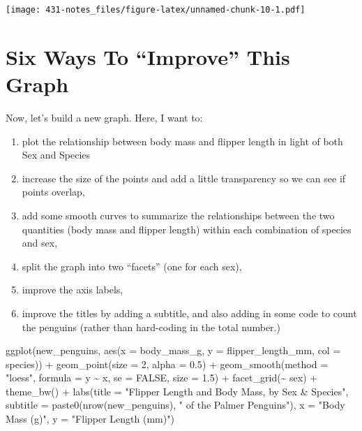 \documentclass[
]{book}
\newenvironment{Shaded}{\begin{snugshade}}{\end{snugshade}}
\newcommand{\AttributeTok}[1]{\textcolor[rgb]{0.77,0.63,0.00}{#1}}
\newcommand{\ConstantTok}[1]{\textcolor[rgb]{0.00,0.00,0.00}{#1}}
\newcommand{\DecValTok}[1]{\textcolor[rgb]{0.00,0.00,0.81}{#1}}
\newcommand{\FloatTok}[1]{\textcolor[rgb]{0.00,0.00,0.81}{#1}}
\newcommand{\FunctionTok}[1]{\textcolor[rgb]{0.00,0.00,0.00}{#1}}
\newcommand{\NormalTok}[1]{#1}
\newcommand{\SpecialCharTok}[1]{\textcolor[rgb]{0.00,0.00,0.00}{#1}}
\newcommand{\StringTok}[1]{\textcolor[rgb]{0.31,0.60,0.02}{#1}}
\providecommand{\tightlist}{%
  \setlength{\itemsep}{0pt}\setlength{\parskip}{0pt}}
\begin{document}
\texttt{[image: 431-notes\_files/figure-latex/unnamed-chunk-10-1.pdf]}

\hypertarget{six-ways-to-improve-this-graph}{%
\section{Six Ways To ``Improve'' This Graph}\label{six-ways-to-improve-this-graph}}

Now, let's build a new graph. Here, I want to:

\begin{enumerate}
\def\labelenumi{\arabic{enumi}.}
\tightlist
\item
  plot the relationship between body mass and flipper length in light of both Sex and Species
\item
  increase the size of the points and add a little transparency so we can see if points overlap,
\item
  add some smooth curves to summarize the relationships between the two quantities (body mass and flipper length) within each combination of species and sex,
\item
  split the graph into two ``facets'' (one for each sex),
\item
  improve the axis labels,
\item
  improve the titles by adding a subtitle, and also adding in some code to count the penguins (rather than hard-coding in the total number.)
\end{enumerate}

\begin{Shaded}
\begin{Highlighting}[]
\FunctionTok{ggplot}\NormalTok{(new\_penguins, }\FunctionTok{aes}\NormalTok{(}\AttributeTok{x =}\NormalTok{ body\_mass\_g, }\AttributeTok{y =}\NormalTok{ flipper\_length\_mm, }
                         \AttributeTok{col =}\NormalTok{ species)) }\SpecialCharTok{+}
    \FunctionTok{geom\_point}\NormalTok{(}\AttributeTok{size =} \DecValTok{2}\NormalTok{, }\AttributeTok{alpha =} \FloatTok{0.5}\NormalTok{) }\SpecialCharTok{+} 
    \FunctionTok{geom\_smooth}\NormalTok{(}\AttributeTok{method =} \StringTok{"loess"}\NormalTok{, }\AttributeTok{formula =}\NormalTok{ y }\SpecialCharTok{\textasciitilde{}}\NormalTok{ x, }
                \AttributeTok{se =} \ConstantTok{FALSE}\NormalTok{, }\AttributeTok{size =} \FloatTok{1.5}\NormalTok{) }\SpecialCharTok{+}
    \FunctionTok{facet\_grid}\NormalTok{(}\SpecialCharTok{\textasciitilde{}}\NormalTok{ sex) }\SpecialCharTok{+}
    \FunctionTok{theme\_bw}\NormalTok{() }\SpecialCharTok{+} 
    \FunctionTok{labs}\NormalTok{(}\AttributeTok{title =} \StringTok{"Flipper Length and Body Mass, by Sex \& Species"}\NormalTok{,}
         \AttributeTok{subtitle =} \FunctionTok{paste0}\NormalTok{(}\FunctionTok{nrow}\NormalTok{(new\_penguins), }\StringTok{" of the Palmer Penguins"}\NormalTok{),}
         \AttributeTok{x =} \StringTok{"Body Mass (g)"}\NormalTok{, }
         \AttributeTok{y =} \StringTok{"Flipper Length (mm)"}\NormalTok{)}
\end{Highlighting}
\end{Shaded}
\end{document}
